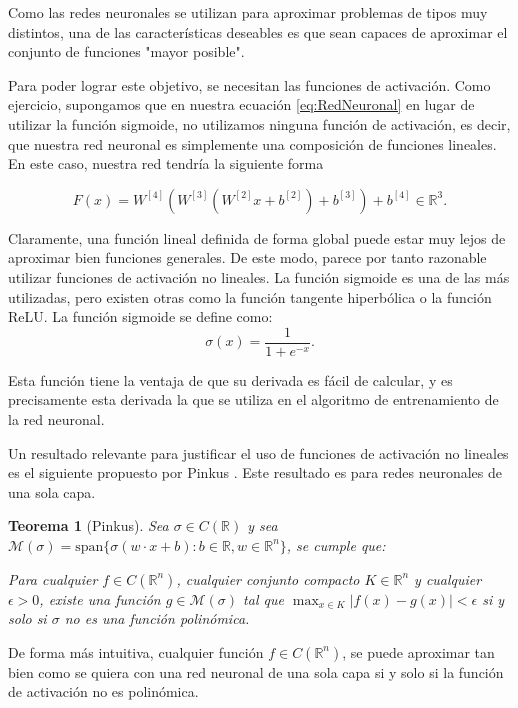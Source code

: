 \documentclass[a4paper,11pt,spanish, twoside, leqno]{tfg-uam}
\newtheorem{teor}{Teorema}[chapter]
\theoremstyle{definition}
\begin{document}
Como las redes neuronales se utilizan para aproximar problemas de tipos muy distintos, una de las características deseables es que sean  capaces de aproximar el conjunto de funciones "mayor posible".

Para poder lograr este objetivo, se necesitan las funciones de activación. Como ejercicio, supongamos que en nuestra ecuación \eqref{eq:RedNeuronal} en lugar de utilizar la función sigmoide, no utilizamos ninguna función de activación, es decir, que nuestra red neuronal es simplemente una composición de funciones lineales. En este caso, nuestra red tendría la siguiente forma

\begin{equation*}
    F(x)=W^{[4]}(W^{[3]}(W^{[2]}x+b^{[2]})+b^{[3]})+b^{[4]}\in\mathbb{R}^3.
\end{equation*}

Claramente, una función lineal definida de forma global puede estar muy lejos de aproximar bien funciones generales. De este modo, parece por tanto razonable utilizar funciones de activación no lineales. La función sigmoide es una de las más utilizadas, pero existen otras como la función tangente hiperbólica o la función ReLU. La función sigmoide se define como:
\begin{equation*}
    \sigma(x)=\frac{1}{1+e^{-x}}.
\end{equation*}

Esta función tiene la ventaja de que su derivada es fácil de calcular, y es precisamente esta derivada la que se utiliza en el algoritmo de entrenamiento de la red neuronal.

Un resultado relevante para justificar el uso de funciones de activación no lineales es el siguiente propuesto por Pinkus \cite[Theorem 3.1]{pinkus1999approximation}. Este resultado es para redes neuronales de una sola capa.

\begin{teor}[Pinkus]
    Sea $\sigma\in C(\mathbb{R})$ y sea $\mathcal{M}(\sigma) = \text{span}\{\sigma(w\cdot x + b): b \in \mathbb{R}, w \in \mathbb{R}^n\}$, se cumple que:
    
    Para cualquier $f \in C(\mathbb{R}^n)$, cualquier conjunto compacto $K\in \mathbb{R}^n$ y cualquier $\epsilon > 0$, existe una función $g\in \mathcal{M}(\sigma)$ tal que $\max_{x\in K}|f(x)-g(x)|<\epsilon$ si y solo si $\sigma$ no es una función polinómica.
\end{teor}
De forma más intuitiva, cualquier función $f \in C(\mathbb{R}^n)$, se puede aproximar tan bien como se quiera con una red neuronal de una sola capa si y solo si la función de activación no es polinómica.
\end{document}
